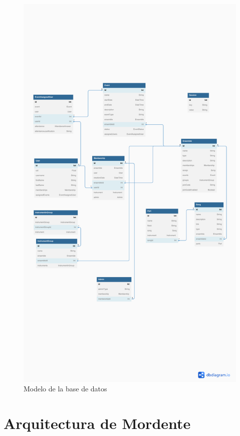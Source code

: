 \begin{figure}[h]
\centering
\includegraphics[width=\textwidth]{imagenes/disenyo_tecnico/mordente-db.pdf}
\caption{Modelo de la base de datos}
\label{fig:modeloBaseDatos}
\end{figure}

\section{Arquitectura de Mordente}

